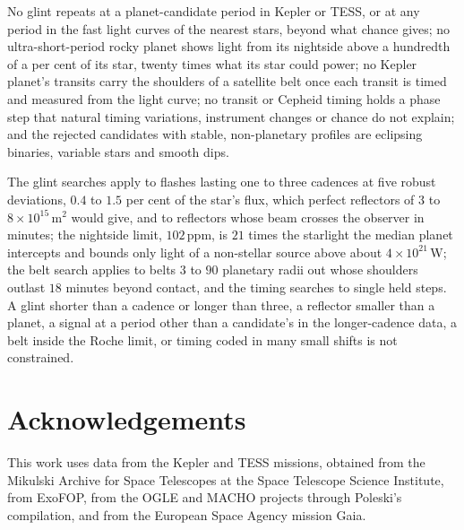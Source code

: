 \documentclass[3p,11pt]{elsarticle}
\begin{document}
No glint repeats at a planet-candidate period in Kepler or TESS, or at any period in the
fast light curves of the nearest stars, beyond what chance gives; no ultra-short-period
rocky planet shows light from its nightside above a hundredth of a per cent of its star,
twenty times what its star could power; no Kepler planet's transits carry the
shoulders of a satellite belt once each transit is timed and measured from the light
curve; no transit or Cepheid timing holds a phase
step that natural timing variations, instrument changes or chance do not explain; and
the rejected candidates with stable, non-planetary profiles are eclipsing binaries,
variable stars and smooth dips.

The glint searches apply to flashes lasting one to three cadences at five robust
deviations, $0.4$ to $1.5$ per cent of the star's flux, which perfect reflectors of
$3$ to $8\times10^{15}$\,m$^2$ would give, and to reflectors whose beam crosses the
observer in minutes; the nightside limit, $102$\,ppm, is $21$ times the starlight the
median planet intercepts and bounds only light of a non-stellar source above about
$4\times10^{21}$\,W; the belt
search applies to belts $3$ to $90$ planetary radii out whose shoulders outlast $18$ minutes
beyond contact, and the timing searches to single held steps. A glint shorter than a
cadence or longer than three, a reflector smaller than a planet, a signal at a period
other than a candidate's in the longer-cadence data, a belt
inside the Roche limit, or timing coded in many small shifts is not constrained.

\section*{Acknowledgements}

This work uses data from the Kepler and TESS missions, obtained from the Mikulski Archive
for Space Telescopes at the Space Telescope Science Institute, from ExoFOP, from the
OGLE and MACHO projects through Poleski's compilation, and from the European Space Agency
mission Gaia.
\end{document}
